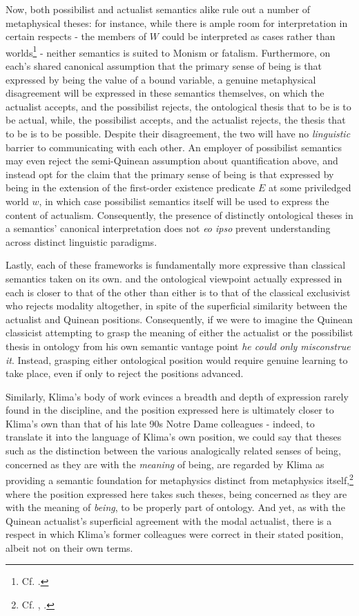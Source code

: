 \documentclass[]{article}
\begin{document}
Now, 
both possibilist and actualist semantics alike rule out a number of metaphysical theses: 
for instance, while there is ample room for interpretation in certain respects - 
the members of $W$ could be interpreted as cases rather than worlds\footnote{Cf. \autocite{CIFOL1,CIFOL2}.} - 
neither semantics is suited to Monism or fatalism. 
Furthermore, 
on each's shared canonical assumption that the primary sense of being is that expressed by being the value of a bound variable, 
a genuine metaphysical disagreement will be expressed in these semantics themselves, 
on which the actualist accepts, 
and the possibilist rejects, 
the ontological thesis that to be is to be actual, 
while, the possibilist accepts, 
and the actualist rejects, 
the thesis that to be is to be possible. 
Despite their disagreement, the two will have no \emph{linguistic} barrier to communicating with each other. 
An employer of possibilist semantics may even reject the semi-Quinean assumption about quantification above, 
and instead opt for the claim 
that the primary sense of being is that expressed by being in the extension of the first-order existence predicate $E$ at some priviledged world $w$, 
in which case possibilist semantics itself will be used to express the content of actualism. 
Consequently, the presence of distinctly ontological theses in a semantics' canonical interpretation does not 
\emph{eo ipso} prevent understanding across distinct linguistic paradigms.  

Lastly, 
each of these frameworks is fundamentally more expressive than classical semantics taken on its own.
and the ontological viewpoint actually expressed in each is closer to that of the other than either is to that of the classical exclusivist who rejects modality altogether, 
in spite of the superficial similarity between the actualist and Quinean positions. 
Consequently, if we were to imagine the Quinean classicist attempting to grasp the meaning of either the actualist or the possibilist thesis in ontology 
from his own semantic vantage point
\emph{he could only misconstrue it}.
Instead, grasping either ontological position would require genuine learning to take place, 
even if only to reject the positions advanced. 

Similarly, 
Klima's body of work evinces a breadth and depth of expression rarely found in the discipline, 
and 
the position expressed here is ultimately closer to Klima's own than that of his late 90s Notre Dame colleagues - 
indeed, to translate it into the language of Klima's own position, 
we could say that theses such as the distinction between the various analogically related senses of being, 
concerned as they are with the \emph{meaning} of being, 
are regarded by Klima as providing a semantic foundation for metaphysics distinct from metaphysics itself,\footnote{Cf. \autocite[88]{Klima1996}, \autocite[49]{Klima2011b}.}
where the position expressed here takes such theses, 
being concerned as they are with the meaning of \emph{being},
to be properly part of ontology. 
And yet, 
as with the Quinean actualist's superficial agreement with the modal actualist, 
there is a respect in which Klima's former colleagues were correct in their stated position, 
albeit not on their own terms. 
\end{document}
